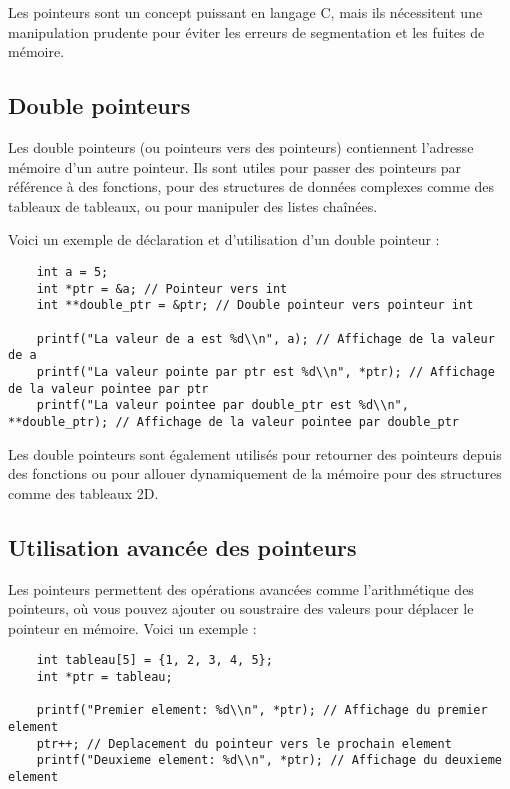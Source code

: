 Les pointeurs sont un concept puissant en langage C, mais ils nécessitent une manipulation prudente pour éviter les erreurs de segmentation et les fuites de mémoire.

\subsection{Double pointeurs}

Les double pointeurs (ou pointeurs vers des pointeurs) contiennent l'adresse mémoire d'un autre pointeur. Ils sont utiles pour passer des pointeurs par référence à des fonctions, pour des structures de données complexes comme des tableaux de tableaux, ou pour manipuler des listes chaînées.

Voici un exemple de déclaration et d'utilisation d'un double pointeur :

\begin{lstlisting}
	int a = 5;
	int *ptr = &a; // Pointeur vers int
	int **double_ptr = &ptr; // Double pointeur vers pointeur int
	
	printf("La valeur de a est %d\\n", a); // Affichage de la valeur de a
	printf("La valeur pointe par ptr est %d\\n", *ptr); // Affichage de la valeur pointee par ptr
	printf("La valeur pointee par double_ptr est %d\\n", **double_ptr); // Affichage de la valeur pointee par double_ptr
\end{lstlisting}

Les double pointeurs sont également utilisés pour retourner des pointeurs depuis des fonctions ou pour allouer dynamiquement de la mémoire pour des structures comme des tableaux 2D.

\subsection{Utilisation avancée des pointeurs}

Les pointeurs permettent des opérations avancées comme l'arithmétique des pointeurs, où vous pouvez ajouter ou soustraire des valeurs pour déplacer le pointeur en mémoire. Voici un exemple :

\begin{lstlisting}
	int tableau[5] = {1, 2, 3, 4, 5};
	int *ptr = tableau;
	
	printf("Premier element: %d\\n", *ptr); // Affichage du premier element
	ptr++; // Deplacement du pointeur vers le prochain element
	printf("Deuxieme element: %d\\n", *ptr); // Affichage du deuxieme element
\end{lstlisting}

